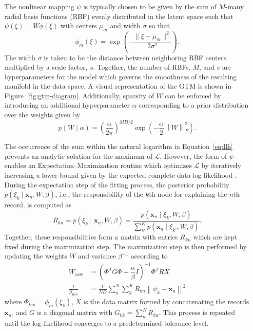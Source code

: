 The nonlinear mapping $\psi$ is typically chosen to be given by the sum of $M$-many radial basis functions (RBF) evenly distributed in the latent space such that $\psi(\xi) = W\phi(\xi)$ with centers $\mu_m$ and width $\sigma$ so that
\begin{equation}
    \phi_m(\xi) = \exp\left(-\dfrac{\lVert \xi - \mu_m \rVert^2}{2\sigma^2}\right).
\end{equation}
The width $\sigma$ is taken to be the distance between neighboring RBF centers multiplied by a scale factor, $s$. Together, the number of RBFs, $M$, and $s$ are hyperparameters for the model which governs the smoothness of the resulting manifold in the data space. %
 A visual representation of the GTM is shown in Figure~\ref{fig:gtm-diagram}. Additionally, sparsity of $W$ can be enforced by introducing an additional hyperparameter $\alpha$ corresponding to a prior distribution over the weights given by
\begin{equation}\label{eq:weight-prior}
    p(W \mid \alpha) =  \left( \frac{\alpha}{2\pi} \right)^{MD/2}\exp\left(-\frac{\alpha}{2}\left\lVert W \right\rVert_{F}^2\right).
\end{equation}

The occurrence of the sum within the natural logarithm in Equation~\eqref{eq:llh} prevents an analytic solution for the maximum of $\mathcal{L}$. However, the form of $\psi$ enables an Expectation--Maximization routine which optimizes $\mathcal{L}$ by iteratively increasing a lower bound given by the expected complete-data log-likelihood \cite{em-algorithm}. %
During the expectation step of the fitting process, the posterior probability $p(\xi_k \mid \mathbf{x}_n, W, \beta)$, i.e., the responsibility of the $k$th node for explaining the $n$th record, is computed as 
\begin{equation}\label{eq:responsibility}
    R_{kn} = p(\xi_k \mid \mathbf{x}_n, W, \beta) = \dfrac{p(\mathbf{x}_n \mid \xi_k, W, \beta)}{\sum\limits_{k'}^{K} p(\mathbf{x}_n \mid \xi_{k'}, W, \beta)}.
\end{equation}
Together, these responsibilities form a matrix with entries $R_{kn}$ which are kept fixed during the maximization step. The maximization step is then performed by updating the weights $W$ and variance $\beta^{-1}$ according to
\begin{align}\label{eq:m-step}
    W_{\text{new}} &= \left(\Phi^T G \Phi + \dfrac{\alpha}{\beta}I \right)^{-1} \Phi^T R X  \\
    \frac{1}{\beta_{\text{new}}} &= \frac{1}{ND} \sum\limits_{n}^{N} \sum\limits_{k}^{K} R_{kn} \left\lVert \psi_k - \mathbf{x}_n \right\rVert^2
\end{align}
where $\Phi_{km} = \phi_m(\xi_k)$, $X$ is the data matrix formed by concatenating the records $\mathbf{x}_n$, and $G$ is a diagonal matrix with $G_{kk} = \sum\limits_n^N R_{kn}$. This process is repeated until the log-likelihood converges to a predetermined tolerance level.

